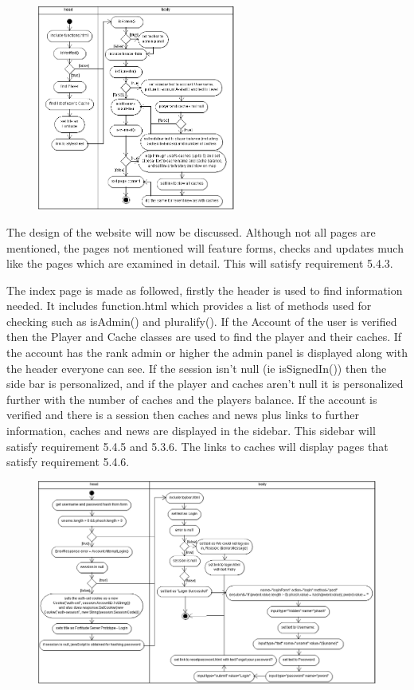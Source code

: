 \begin{figure}
    \includegraphics[width=0.58\textwidth]{images/activity/IndexHTML}
\end{figure}

The design of the website will now be discussed. Although not all pages are mentioned, the pages not mentioned will feature forms, checks and updates much like the pages which are examined in detail. This will satisfy requirement 5.4.3.

The index page is made as followed, firstly the header is used to find information needed. It includes function.html which provides a list of methods used for checking such as isAdmin() and pluralify(). If the Account of the user is verified then the Player and Cache classes are used to find the player and their caches. If the account has the rank admin or higher the admin panel is displayed along with the header everyone can see. If the session isn't null (ie isSignedIn()) then the side bar is personalized, and if the player and caches aren't null it is personalized further with the number of caches and the players balance. If the account is verified and there is a session then caches and news plus links to further information, caches and news are displayed in the sidebar. This sidebar will satisfy requirement 5.4.5 and 5.3.6. The links to caches will display pages that satisfy requirement 5.4.6.

\begin{landscape}
\begin{figure}
    \centering
    \includegraphics[width=1.2\textheight]{images/activity/loginWeb2}
\end{figure}
\end{landscape}

